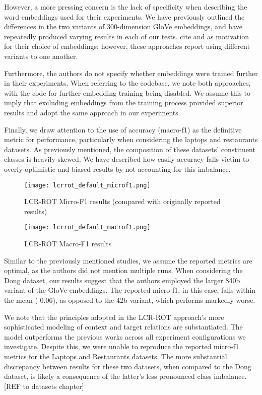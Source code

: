 \documentclass[../../fyp.tex]{subfiles}
\begin{document}
However, a more pressing concern is the lack of specificity when describing the word embeddings used for their experiments. We have previously outlined the differences in the two variants of 300-dimension GloVe embeddings, and have repeatedly produced varying results in each of our tests. \cite{zheng2018} cite \cite{wang2018} and \cite{tang2016} as motivation for their choice of embeddings; however, these approaches report using different variants to one another.

Furthermore, the authors do not specify whether embeddings were trained further in their experiments. When referring to the codebase, we note both approaches, with the code for further embedding training being disabled. We assume this to imply that excluding embeddings from the training process provided superior results and adopt the same approach in our experiments. 

Finally, we draw attention to the use of accuracy (macro-f1) as the definitive metric for performance, particularly when considering the laptops and restaurants datasets. As previously mentioned, the composition of these datasets' constituent classes is heavily skewed. We have described how easily accuracy falls victim to overly-optimistic and biased results by not accounting for this imbalance.   

\begin{figure}[!ht]
	\centering
	\texttt{[image: lcrrot\_default\_microf1.png]}
	\caption{LCR-ROT Micro-F1 results (compared with originally reported results)}
	\label{fig:ffnn}
\end{figure}

\begin{figure}[!ht]
	\centering
	\texttt{[image: lcrrot\_default\_macrof1.png]}
	\caption{LCR-ROT Macro-F1 results}
	\label{fig:ffnn}
\end{figure}

Similar to the previously mentioned studies, we assume the reported metrics are optimal, as the authors did not mention multiple runs. When considering the Dong dataset, our results suggest that the authors employed the larger 840b variant of the GloVe embeddings. The reported micro-f1, in this case, falls within the mean (-0.06), as opposed to the 42b variant, which performs markedly worse. 

We note that the principles adopted in the LCR-ROT approach's more sophisticated modeling of context and target relations are substantiated. The model outperforms the previous works across all experiment configurations we investigate. Despite this, we were unable to reproduce the reported micro-f1 metrics for the Laptops and Restaurants datasets. The more substantial discrepancy between results for these two datasets, when compared to the Dong dataset, is likely a consequence of the latter's less pronounced class imbalance. [REF to datasets chapter] 
\end{document}
